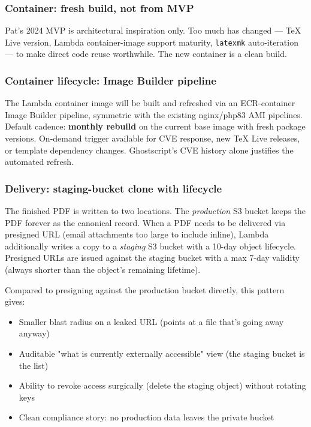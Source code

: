 \documentclass[11pt,letterpaper]{article}
\begin{document}
\subsubsection{Container: fresh build, not from MVP}
Pat's 2024 MVP is architectural inspiration only. Too much has changed --- TeX Live version, Lambda container-image support maturity, \texttt{latexmk} auto-iteration --- to make direct code reuse worthwhile. The new container is a clean build.

\subsubsection{Container lifecycle: Image Builder pipeline}
The Lambda container image will be built and refreshed via an ECR-container Image Builder pipeline, symmetric with the existing nginx/php83 AMI pipelines. Default cadence: \textbf{monthly rebuild} on the current base image with fresh package versions. On-demand trigger available for CVE response, new TeX Live releases, or template dependency changes. Ghostscript's CVE history alone justifies the automated refresh.

\subsubsection{Delivery: staging-bucket clone with lifecycle}
The finished PDF is written to two locations. The \emph{production} S3 bucket keeps the PDF forever as the canonical record. When a PDF needs to be delivered via presigned URL (email attachments too large to include inline), Lambda additionally writes a copy to a \emph{staging} S3 bucket with a 10-day object lifecycle. Presigned URLs are issued against the staging bucket with a max 7-day validity (always shorter than the object's remaining lifetime).

Compared to presigning against the production bucket directly, this pattern gives:
\begin{itemize}[nosep]
  \item Smaller blast radius on a leaked URL (points at a file that's going away anyway)
  \item Auditable "what is currently externally accessible" view (the staging bucket is the list)
  \item Ability to revoke access surgically (delete the staging object) without rotating keys
  \item Clean compliance story: no production data leaves the private bucket
\end{itemize}
\end{document}
